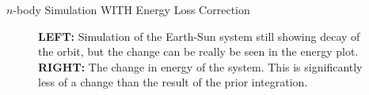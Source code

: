 \documentclass{beamer}
\begin{document}
\begin{frame}{$n$-body Simulation WITH Energy Loss Correction}
        \begin{figure}[h]
        \centering
        \begin{minipage}{0.5\linewidth}
        \end{minipage}%
        \begin{minipage}{0.5\linewidth}
        \end{minipage}%
        \caption{\textbf{LEFT:} Simulation of the Earth-Sun system still showing
        decay of the orbit, but the change can be really be seen in the energy
        plot.
        \textbf{RIGHT:}
            The change in energy of the system. This is significantly less of a
        change than the result of the prior integration.}
    \end{figure}
\end{frame}
\end{document}
